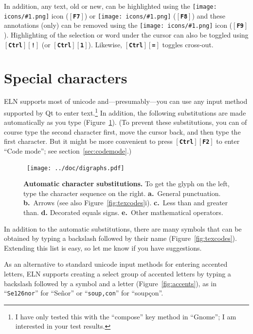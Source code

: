 \documentclass[11pt]{report}
\def\keystroke#1{$\left[\right.\!${\tt\bfseries #1}$\!\left.\right]$}
\def\key#1{\keystroke{#1}}
\def\keycombo#1#2{\keystroke{#1}\keystroke{#2}}
\def\keycontrol#1{\keycombo{Ctrl}{#1}}
\def\icon#1{\raise-2pt\hbox{\texttt{[image: icons/\#1.png]}}}
\begin{document}
In addition, any text, old or new, can be highlighted using the
\icon{highlight} icon (\key{F7}) or \icon{strikeout} (\key{F8}) and these
annotations (only) can be removed using the \icon{plain} icon
(\key{F9}). Highlighting of the selection or word under the cursor can
also be toggled using \keycontrol{!} (or \keycontrol{1}). Likewise,
\keycontrol{=} toggles cross-out.

\section{Special characters}

ELN supports most of unicode and---presumably---you can use any input
method supported by Qt to enter text.\footnote{I have only tested this
  with the ``compose'' key method in ``Gnome''; I am interested in
  your test results.} In addition, the following substitutions are
made automatically as you type (Figure~\ref{fig:charsubst}).  (To
prevent these substitutions, you can of course type the second
character first, move the cursor back, and then type the first
character. But it might be more convenient to press \keycontrol{F2} to
enter ``Code mode''; see section~\ref{sec:codemode}.)

\begin{figure}[t]
\noindent~\hfill\texttt{[image: ../doc/digraphs.pdf]}\hfill~\vspace{-40pt}

\caption{{\bf Automatic character substitutions.} To get the glyph on
  the left, type the character sequence on the right. {\bf a.}~General
  punctuation. {\bf b.}~Arrows (see also Figure~\ref{fig:texcodes}i). {\bf c.}~Less than and greater
  than. {\bf d.} Decorated equals signs. {\bf e.}~Other mathematical
  operators.}\label{fig:charsubst}
\end{figure}

In addition to the automatic substitutions, there are many symbols
that can be obtained by typing a backslash followed by their name
(Figure~\ref{fig:texcodes}).  Extending this list
is easy, so let me know if you have suggestions.

As an alternative to standard unicode input methods for entering
accented letters, ELN supports creating a select group of accented
letters by typing a backslash followed by a symbol and a letter
(Figure~\ref{fig:accents}), as in ``{\tt Se\char126nor}'' for
``Se\~nor'' or ``{\tt soup,con}'' for ``soup\c{c}on''. 
\end{document}
